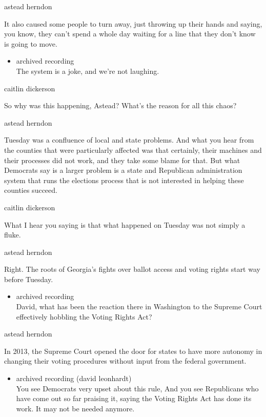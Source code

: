 astead herndon

It also caused some people to turn away, just throwing up their hands
and saying, you know, they can't spend a whole day waiting for a line
that they don't know is going to move.

\begin{itemize}
\tightlist
\item
  archived recording\\
  The system is a joke, and we're not laughing.
\end{itemize}

caitlin dickerson

So why was this happening, Astead? What's the reason for all this chaos?

astead herndon

Tuesday was a confluence of local and state problems. And what you hear
from the counties that were particularly affected was that certainly,
their machines and their processes did not work, and they take some
blame for that. But what Democrats say is a larger problem is a state
and Republican administration system that runs the elections process
that is not interested in helping these counties succeed.

caitlin dickerson

What I hear you saying is that what happened on Tuesday was not simply a
fluke.

astead herndon

Right. The roots of Georgia's fights over ballot access and voting
rights start way before Tuesday.

\begin{itemize}
\tightlist
\item
  archived recording\\
  David, what has been the reaction there in Washington to the Supreme
  Court effectively hobbling the Voting Rights Act?
\end{itemize}

astead herndon

In 2013, the Supreme Court opened the door for states to have more
autonomy in changing their voting procedures without input from the
federal government.

\begin{itemize}
\tightlist
\item
  archived recording (david leonhardt)\\
  You see Democrats very upset about this rule, And you see Republicans
  who have come out so far praising it, saying the Voting Rights Act has
  done its work. It may not be needed anymore.
\end{itemize}


